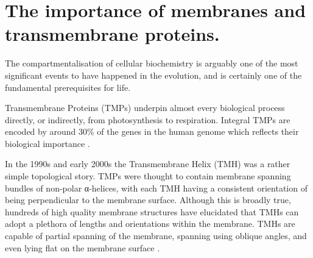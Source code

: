 \documentclass[12pt,PhD,twoside]{muthesis}
\begin{document}
\section{The importance of membranes and transmembrane proteins.}
The compartmentalisation of cellular biochemistry is arguably one of the most significant events to have happened in the evolution, and is certainly one of the fundamental prerequisites for life\cite{Koshland2002}.

Transmembrane Proteins (TMPs) underpin almost every biological process directly, or indirectly, from photosynthesis to respiration. Integral TMPs are encoded by around 30\% of the genes in the human genome which reflects their biological importance \cite{Almen2009}.

In the 1990s and early 2000s the Transmembrane Helix (TMH) was a rather simple topological story. TMPs were thought to contain membrane spanning bundles of non-polar α-helices, with each TMH having a consistent orientation of being perpendicular to the membrane surface. Although this is broadly true, hundreds of high quality membrane structures have elucidated that TMHs can adopt a plethora of lengths and orientations within the membrane. TMHs are capable of partial spanning of the membrane, spanning using oblique angles, and even lying flat on the membrane surface \cite{VonHeijne2006, Elofsson2007}.
\end{document}
